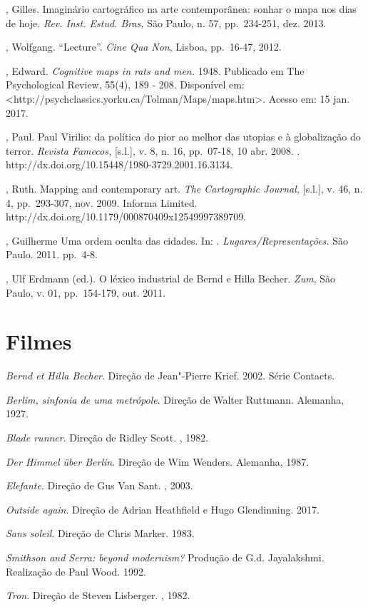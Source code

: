 \begin{Parskip}
, Gilles. Imaginário cartográfico na arte contemporânea:
sonhar o mapa nos dias de hoje. \emph{Rev. Inst. Estud. Bras,} São
Paulo, n. 57, pp.~234-251, dez. 2013.

, Wolfgang. ``Lecture''. \emph{Cine Qua Non}, Lisboa, pp.~16-47,
2012.

, Edward. \emph{Cognitive maps in rats and men.} 1948. Publicado
em The Psychological Review, 55(4), 189 - 208. Disponível em:
\textless{}http://psychclassics.yorku.ca/Tolman/Maps/maps.htm\textgreater{}.
Acesso em: 15 jan. 2017.

, Paul. Paul Virilio: da política do pior ao melhor das utopias e
à globalização do terror. \emph{Revista Famecos,} {[}s.l.{]}, v. 8, n.
16, pp.~07-18, 10 abr. 2008. .
http://dx.doi.org/10.15448/1980-3729.2001.16.3134.

, Ruth. Mapping and contemporary art. \emph{The Cartographic
Journal,} {[}s.l.{]}, v. 46, n. 4, pp.~293-307, nov. 2009. Informa 
Limited. http://dx.doi.org/10.1179/000870409x12549997389709.

, Guilherme Uma ordem oculta das cidades. In: .
\emph{Lugares/Representações.} São Paulo. 2011. pp.~4-8.

, Ulf Erdmann (ed.). O léxico industrial de Bernd e Hilla Becher.
\emph{Zum}, São Paulo, v. 01, pp.~154-179, out. 2011.
\end{Parskip}

\section{Filmes}

\begin{Parskip}
\emph{Bernd et Hilla Becher}. Direção de Jean"-Pierre Krief. 2002. Série
Contacts.

\emph{Berlim, sinfonia de uma metrópole}. Direção de Walter Ruttmann. Alemanha,
1927.

\emph{Blade runner}. Direção de Ridley Scott. , 1982.

\emph{Der Himmel über Berlin}. Direção de Wim Wenders. Alemanha, 1987.

\emph{Elefante}. Direção de Gus Van Sant. , 2003.

\emph{Outside again}. Direção de Adrian Heathfield e Hugo Glendinning. 2017.

\emph{Sans soleil}. Direção de Chris Marker. 1983.

\emph{Smithson and Serra: beyond modernism?} Produção de G.d. Jayalakshmi.
Realização de Paul Wood. 1992.

\emph{Tron}. Direção de Steven Lisberger. , 1982.
\end{Parskip}